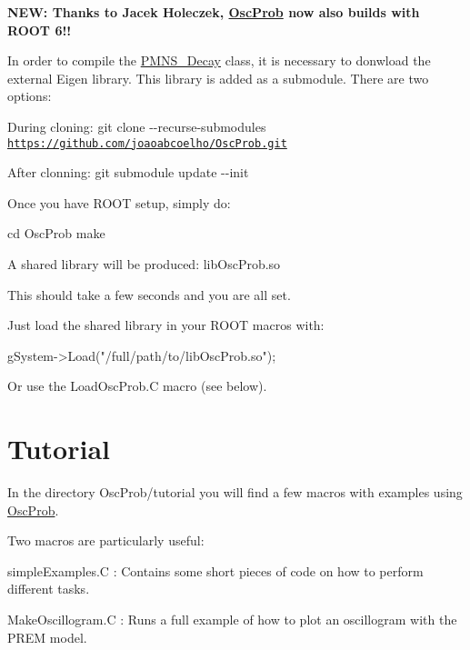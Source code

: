 {\bfseries N\+EW\+: Thanks to Jacek Holeczek, \hyperlink{namespaceOscProb}{Osc\+Prob} now also builds with R\+O\+OT 6!!}

In order to compile the \hyperlink{classOscProb_1_1PMNS__Decay}{P\+M\+N\+S\+\_\+\+Decay} class, it is necessary to donwload the external Eigen library. This library is added as a submodule. There are two options\+:
\begin{DoxyItemize}
\item During cloning\+: {\ttfamily git clone -\/-\/recurse-\/submodules \href{https://github.com/joaoabcoelho/OscProb.git}{\tt https\+://github.\+com/joaoabcoelho/\+Osc\+Prob.\+git}}
\item After clonning\+: {\ttfamily git submodule update -\/-\/init}
\end{DoxyItemize}

Once you have R\+O\+OT setup, simply do\+: 
\begin{DoxyCode}
cd OscProb
make
\end{DoxyCode}


A shared library will be produced\+: {\ttfamily lib\+Osc\+Prob.\+so}

This should take a few seconds and you are all set.

Just load the shared library in your R\+O\+OT macros with\+: 
\begin{DoxyCode}
gSystem->Load(\textcolor{stringliteral}{"/full/path/to/libOscProb.so"});
\end{DoxyCode}


Or use the {\ttfamily Load\+Osc\+Prob.\+C} macro (see below).

\section*{Tutorial}

In the directory Osc\+Prob/tutorial you will find a few macros with examples using \hyperlink{namespaceOscProb}{Osc\+Prob}.

Two macros are particularly useful\+:
\begin{DoxyItemize}
\item {\ttfamily simple\+Examples.\+C} \+: Contains some short pieces of code on how to perform different tasks.
\item {\ttfamily Make\+Oscillogram.\+C} \+: Runs a full example of how to plot an oscillogram with the P\+R\+EM model.
\end{DoxyItemize}

